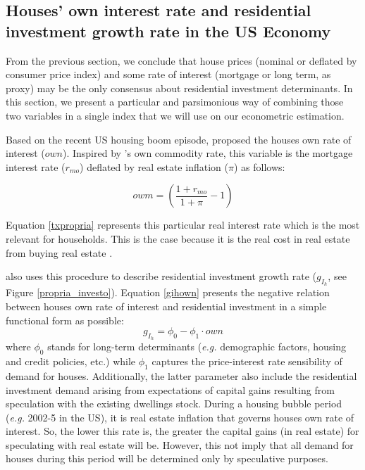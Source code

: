 \documentclass[12pt, a4paper]{article}
\begin{document}
\subsection{Houses' own interest rate and residential investment growth rate in the US Economy}
\label{sec:orgaf6de5e}
\label{sc:own}

From the previous section, we conclude that house prices (nominal or deflated by consumer price index) and some rate of interest (mortgage or long term, as proxy) may be the only consensus about residential investment determinants.
In this section, we present a particular and parsimonious way of combining those two variables  in a single index that we will use on our econometric estimation.

Based on the recent US housing boom episode, \textcite{teixeira_crescimento_2015}  proposed the houses own rate of interest (\(own\)).
Inspired by \citeauthor*{sraffaDrHayekMoney1932}'s \citeyear{sraffaDrHayekMoney1932} own commodity rate, this variable is the mortgage interest rate (\(r_{mo}\)) deflated by real estate inflation (\(\pi\)) as follows:
\begin{latex}
\begin{equation}
\label{txpropria}
owm =  \left(\frac{1+r_{mo}}{1+\pi} - 1\right)
\end{equation}
\end{latex}
Equation \ref{txpropria} represents this particular real interest rate which is the most relevant for households.
This is the case because it is the real cost in real estate from buying real estate  \cite[p.~53]{teixeira_crescimento_2015}.

\textcite{teixeira_crescimento_2015} also uses this procedure to describe residential investment growth rate (\(g_{I_{h}}\), see Figure \ref{propria_investo}).
Equation \ref{gihown} presents the negative relation between houses own rate of interest and residential investment in a simple functional form as possible:
\begin{equation}
\label{gihown}
g_{I_h} = \phi_0 - \phi_1\cdot own
\end{equation}
where \(\phi_0\) stands for long-term determinants (\emph{e.g.} demographic factors, housing and credit policies, etc.) while \(\phi_1\) captures the price-interest rate sensibility of demand for houses.
Additionally, the latter parameter also include the residential investment demand arising from expectations of capital gains resulting from speculation with the existing dwellings stock.
During a housing bubble period (\emph{e.g.} 2002-5 in the US), it is real estate inflation that governs houses own rate of interest.
So, the lower this rate is, the greater the capital gains (in real estate) for speculating with real estate will be.
However, this not imply that all demand for houses during this period will be determined only by speculative purposes.
\end{document}
